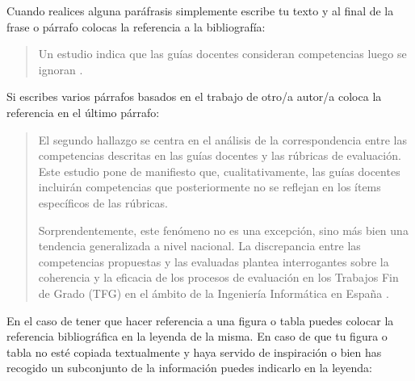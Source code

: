 Cuando realices alguna paráfrasis simplemente escribe tu texto y al final de la frase o párrafo colocas la referencia a la bibliografía:

\begin{quote}
\begin{it}
     Un estudio indica que las guías docentes consideran competencias luego se ignoran \cite{fernandez2023evaluacion}.
\end{it}
\end{quote}

Si escribes varios párrafos basados en el trabajo de otro/a autor/a coloca la referencia en el último párrafo:

\begin{quote}
\begin{it}
    El segundo hallazgo se centra en el análisis de la correspondencia entre las competencias descritas en las guías docentes y las rúbricas de evaluación. Este estudio pone de manifiesto que, cualitativamente, las guías docentes incluirán competencias que posteriormente no se reflejan en los ítems específicos de las rúbricas.
    
    Sorprendentemente, este fenómeno no es una excepción, sino más bien una tendencia generalizada a nivel nacional. La discrepancia entre las competencias propuestas y las evaluadas plantea interrogantes sobre la coherencia y la eficacia de los procesos de evaluación en los Trabajos Fin de Grado (TFG) en el ámbito de la Ingeniería Informática en España \cite{fernandez2023evaluacion}.
\end{it}
\end{quote}

En el caso de tener que hacer referencia a una figura o tabla puedes colocar la referencia bibliográfica en la leyenda de la misma. En caso de que tu figura o tabla no esté copiada textualmente y haya servido de inspiración o bien has recogido un subconjunto de la información puedes indicarlo en la leyenda:


